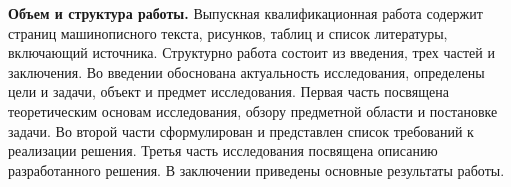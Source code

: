 
\textbf{Объем и структура работы.}
Выпускная квалификационная работа содержит  страниц машинописного текста,  рисунков,  таблиц и список литературы, включающий  источника. 
Структурно работа состоит из введения, трех частей и заключения. 
Во введении обоснована актуальность исследования, определены цели и задачи, объект и предмет исследования. 
Первая часть посвящена теоретическим основам исследования, обзору предметной области и постановке задачи. 
Во второй части сформулирован и представлен список требований к реализации решения.
Третья часть исследования посвящена описанию разработанного решения.
В заключении приведены основные результаты работы.